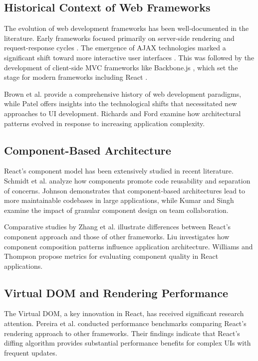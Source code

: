 \subsection{Historical Context of Web Frameworks}
The evolution of web development frameworks has been well-documented in the literature. Early frameworks focused primarily on server-side rendering and request-response cycles \cite{fielding2000, gamma1995, fowler2002}. The emergence of AJAX technologies marked a significant shift toward more interactive user interfaces \cite{garrett2005, mahemoff2006}. This was followed by the development of client-side MVC frameworks like Backbone.js \cite{osmani2012}, which set the stage for modern frameworks including React \cite{react2013}.

Brown et al. \cite{brown2016} provide a comprehensive history of web development paradigms, while Patel \cite{patel2018} offers insights into the technological shifts that necessitated new approaches to UI development. Richards and Ford \cite{richards2018} examine how architectural patterns evolved in response to increasing application complexity.

\subsection{Component-Based Architecture}
React's component model has been extensively studied in recent literature. Schmidt et al. \cite{schmidt2017} analyze how components promote code reusability and separation of concerns. Johnson \cite{johnson2019} demonstrates that component-based architectures lead to more maintainable codebases in large applications, while Kumar and Singh \cite{kumar2020} examine the impact of granular component design on team collaboration.

Comparative studies by Zhang et al. \cite{zhang2021} illustrate differences between React's component approach and those of other frameworks. Liu \cite{liu2019} investigates how component composition patterns influence application architecture. Williams and Thompson \cite{williams2020} propose metrics for evaluating component quality in React applications.

\subsection{Virtual DOM and Rendering Performance}
The Virtual DOM, a key innovation in React, has received significant research attention. Pereira et al. \cite{pereira2020} conducted performance benchmarks comparing React's rendering approach to other frameworks. Their findings indicate that React's diffing algorithm provides substantial performance benefits for complex UIs with frequent updates.

